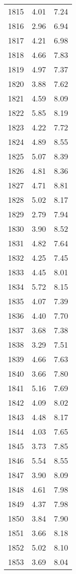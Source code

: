 \begin{longtable}{lrr}
1815 &    4.01 &    7.24 \\
1816 &    2.96 &    6.94 \\
1817 &    4.21 &    6.98 \\
1818 &    4.66 &    7.83 \\
1819 &    4.97 &    7.37 \\
1820 &    3.88 &    7.62 \\
1821 &    4.59 &    8.09 \\
1822 &    5.85 &    8.19 \\
1823 &    4.22 &    7.72 \\
1824 &    4.89 &    8.55 \\
1825 &    5.07 &    8.39 \\
1826 &    4.81 &    8.36 \\
1827 &    4.71 &    8.81 \\
1828 &    5.02 &    8.17 \\
1829 &    2.79 &    7.94 \\
1830 &    3.90 &    8.52 \\
1831 &    4.82 &    7.64 \\
1832 &    4.25 &    7.45 \\
1833 &    4.45 &    8.01 \\
1834 &    5.72 &    8.15 \\
1835 &    4.07 &    7.39 \\
1836 &    4.40 &    7.70 \\
1837 &    3.68 &    7.38 \\
1838 &    3.29 &    7.51 \\
1839 &    4.66 &    7.63 \\
1840 &    3.66 &    7.80 \\
1841 &    5.16 &    7.69 \\
1842 &    4.09 &    8.02 \\
1843 &    4.48 &    8.17 \\
1844 &    4.03 &    7.65 \\
1845 &    3.73 &    7.85 \\
1846 &    5.54 &    8.55 \\
1847 &    3.90 &    8.09 \\
1848 &    4.61 &    7.98 \\
1849 &    4.37 &    7.98 \\
1850 &    3.84 &    7.90 \\
1851 &    3.66 &    8.18 \\
1852 &    5.02 &    8.10 \\
1853 &    3.69 &    8.04 \\

\end{longtable}
